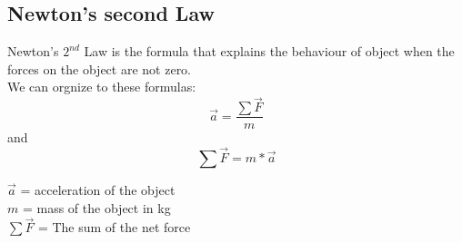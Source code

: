 \documentclass[11pt]{report}
\theoremstyle{remark}
\begin{document}
\subsection{Newton's second Law}
Newton's $2^{nd}$ Law is the formula that explains the behaviour of object when the forces on the object 
are not zero. \\
We can orgnize to these formulas:
\begin{equation}
    \vec{a} = \frac{\sum \vec{F}}{m}
\end{equation}
and\\
\begin{equation}
    \sum \vec{F} = m * \vec{a}
\end{equation}
\begin{center}
    $\vec{a}$ = acceleration of the object \\ 
    $m$ = mass of the object in kg \\ 
    $\sum \vec{F}$ = The sum of the net force
\end{center}
\end{document}
